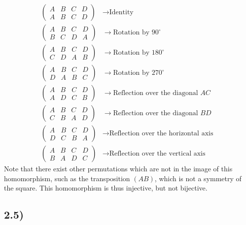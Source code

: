 \documentclass[12pt, letterpaper, twoside]{report}
\begin{document}
$$
\begin{aligned}
\begin{pmatrix}
A & B & C & D \\
A & B & C & D
\end{pmatrix} & \rightarrow \text{Identity} \\
\begin{pmatrix}
A & B & C & D \\
B & C & D & A
\end{pmatrix} & \rightarrow \text{Rotation by } 90^\circ \\
\begin{pmatrix}
A & B & C & D \\
C & D & A & B
\end{pmatrix} & \rightarrow \text{Rotation by } 180^\circ \\
\begin{pmatrix}
A & B & C & D \\
D & A & B & C
\end{pmatrix} & \rightarrow \text{Rotation by } 270^\circ \\
\begin{pmatrix}
A & B & C & D \\
A & D & C & B
\end{pmatrix} & \rightarrow \text{Reflection over the diagonal } AC \\
\begin{pmatrix}
A & B & C & D \\
C & B & A & D
\end{pmatrix} & \rightarrow \text{Reflection over the diagonal } BD \\
\begin{pmatrix}
A & B & C & D \\
D & C & B & A
\end{pmatrix} & \rightarrow \text{Reflection over the horizontal axis } \\
\begin{pmatrix}
A & B & C & D \\
B & A & D & C
\end{pmatrix} & \rightarrow \text{Reflection over the vertical axis }
\end{aligned}
$$
Note that there exist other permutations which are not in the image of this homomorphism, such as the transposition $(A B)$, which is not a symmetry of the square. This homomorphism is thus injective, but not bijective.


\subsection*{2.5)}
\end{document}
